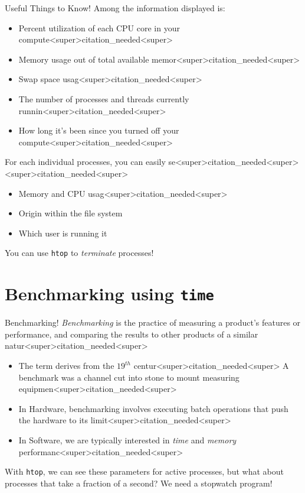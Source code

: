 \documentclass[11pt]{beamer}
\begin{document}
\begin{frame}{Useful Things to Know!}
Among the information displayed is:
\begin{itemize}
\item Percent utilization of each CPU core in your compute<super>citation_needed<super>
\item Memory usage out of total available memor<super>citation_needed<super>
\item Swap space usag<super>citation_needed<super>
\item The number of processes and threads currently runnin<super>citation_needed<super>
\item How long it's been since you turned off your compute<super>citation_needed<super>  
\end{itemize}
For each individual processes, you can easily se<super>citation_needed<super><super>citation_needed<super>
\begin{itemize}
\item Memory and CPU usag<super>citation_needed<super> 
\item Origin within the file system
\item Which user is running it
\end{itemize}
You can use \texttt{htop} to \emph{terminate} processes!
\end{frame}

\section[time]{Benchmarking using \texttt{time}}
\begin{frame}{Benchmarking!}
\textit{Benchmarking} is the practice of measuring a product's features or performance, and comparing the results to other products of a similar natur<super>citation_needed<super>
\begin{itemize}
\item The term derives from the $19^{th}$ centur<super>citation_needed<super>  A benchmark was a channel cut into stone to mount measuring equipmen<super>citation_needed<super>
\item In Hardware, benchmarking involves executing batch operations that push the hardware to its limit<super>citation_needed<super>
\item In Software, we are typically interested in \emph{time} and \emph{memory} performanc<super>citation_needed<super>  
\end{itemize}
With \texttt{htop}, we can see these parameters for active processes, but what about processes that take a fraction of a second?  We need a stopwatch program! 
\end{frame}
\end{document}
